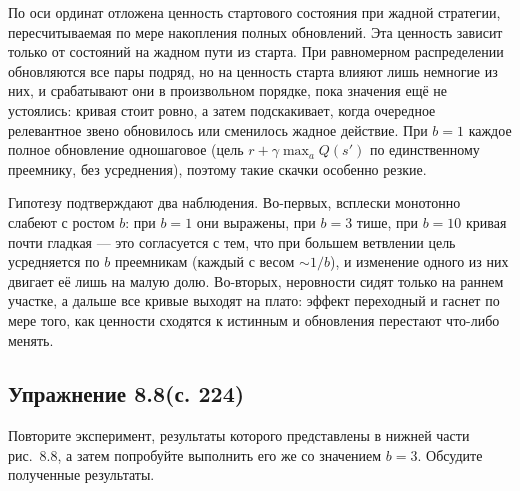\begin{solution}
    По оси ординат отложена ценность стартового состояния при жадной стратегии,
    пересчитываемая по мере накопления полных обновлений. Эта ценность зависит
    только от состояний на жадном пути из старта. При равномерном распределении
    обновляются все пары подряд, но на ценность старта влияют лишь немногие из
    них, и срабатывают они в произвольном порядке, пока
    значения ещё не устоялись: кривая стоит ровно, а затем подскакивает, когда
    очередное релевантное звено обновилось или сменилось жадное действие. При
    $b=1$ каждое полное обновление одношаговое (цель $r+\gamma\max_a Q(s')$ по
    единственному преемнику, без усреднения), поэтому такие скачки особенно
    резкие.

    Гипотезу подтверждают два наблюдения. Во-первых, всплески монотонно слабеют с
    ростом $b$: при $b=1$ они выражены, при $b=3$ тише, при $b=10$ кривая почти
    гладкая --- это согласуется с тем, что при большем ветвлении цель усредняется
    по $b$ преемникам (каждый с весом $\sim 1/b$), и изменение одного из них
    двигает её лишь на малую долю. Во-вторых, неровности сидят только на раннем
    участке, а дальше все кривые выходят на плато: эффект переходный и гаснет по
    мере того, как ценности сходятся к истинным и обновления перестают что-либо
    менять.
\end{solution}

\subsection{Упражнение 8.8(с. 224)}
Повторите эксперимент, результаты которого
представлены в нижней части рис.~8.8, а затем попробуйте выполнить его же со
значением $b=3$. Обсудите полученные результаты.


